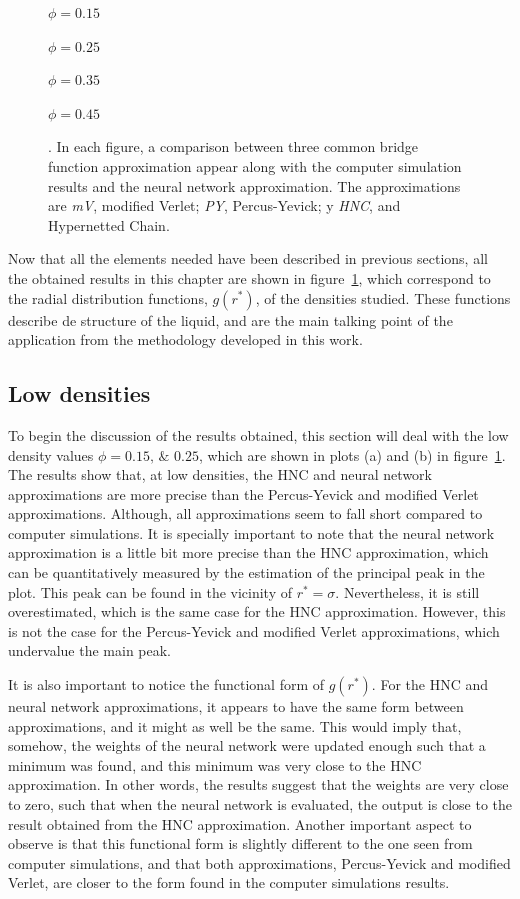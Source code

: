 \begin{figure}[p]
{    \begin{enumerate*}[label=(\alph*),itemjoin={,\enspace}]
        \item $\phi=\num{0.15}$
        \item $\phi=\num{0.25}$
        \item $\phi=\num{0.35}$
        \item $\phi=\num{0.45}$
    \end{enumerate*}
    . In each figure, a comparison between three common bridge function approximation appear along with the computer simulation results and the neural network approximation. The approximations are \emph{mV}, modified Verlet; \emph{PY}, Percus-Yevick; y \emph{HNC}, and Hypernetted Chain.}
    \label{fig:estructuras-neuronales}
\end{figure}

Now that all the elements needed have been described in previous sections, all the obtained
results in this chapter are shown in figure~\ref{fig:estructuras-neuronales}, which 
correspond to the radial distribution functions, $g(r^*)$, of the densities studied.
These functions describe de structure of the liquid, and are the main talking point of the
application from the methodology developed in this work.

\subsection{Low densities}
To begin the discussion of the results obtained, this section will deal with the low 
density values $\phi=\numlist{0.15; 0.25}$, which are shown in plots (a) and (b) in 
figure~\ref{fig:estructuras-neuronales}.
The results show that, at low densities, the HNC and neural network approximations are
more precise than the Percus-Yevick and modified Verlet approximations. Although, all
approximations seem to fall short compared to computer simulations. It is specially
important to note that the neural network approximation is a little bit more precise than
the HNC approximation, which can be quantitatively measured by the estimation of the
principal peak in the plot. This peak can be found in the vicinity of $r^* = \sigma$. 
Nevertheless, it is still overestimated, which is the same case for the HNC approximation.
However, this is not the case for the Percus-Yevick and modified Verlet approximations,
which undervalue the main peak.

It is also important to notice the functional form of $g(r^*)$. For the HNC and neural
network approximations, it appears to have the same form between approximations, and it 
might as well be the same. This would imply that, somehow, the weights of the neural network
were updated enough such that a minimum was found, and this minimum was very close to the
HNC approximation. In other words, the results suggest that the weights are very close to
zero, such that when the neural network is evaluated, the output is close to the
result obtained from the HNC approximation.
Another important aspect to observe is that this functional form is slightly different
to the one seen from computer simulations, and that both approximations, Percus-Yevick and
modified Verlet, are closer to the form found in the computer simulations results.

